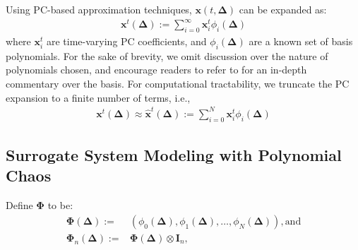 \documentclass[letterpaper, 10 pt, conference]{ieeeconf}  %
\newcommand{\real}{\mathbb{R}}
\newcommand{\vo}[1]{\boldsymbol{#1}}
\newcommand{\Del}{\vo{\Delta}}
\begin{document}
 Using PC-based approximation techniques, $\vo{x}(t,\Del)$ can be expanded as:
\begin{align}
   \vo{x}^t(\Del) := \sum_{i=0}^{\infty}\vo{x}_i^t\phi_i(\Del)
\end{align}
where $\vo{x}_i^t$ are time-varying PC coefficients, and $\phi_i(\Del)$ are a known set of basis polynomials.
For the sake of brevity, we omit discussion over the nature of polynomials chosen, and encourage readers to refer to \cite{bhattacharya2019robust} for an in-depth commentary over the basis.
For computational tractability, we truncate the PC expansion to a finite number of terms, i.e.,
\begin{align}
   \vo{x}^t(\Del) \approx \vo{\hat{x}}^t(\Del) := \sum_{i=0}^{N}\vo{x}_i^t\phi_i(\Del)
   \label{eqn:xApproxSum}
\end{align}

\subsection{Surrogate System Modeling with Polynomial Chaos}
Define $\vo{\Phi}$ to be:
\begin{align}
   \vo{\Phi}(\vo{\Delta}) :=& (\phi_0(\vo{\Delta}), \phi_1(\vo{\Delta}) {}, \hdots, {} \phi_N(\vo{\Delta})), \textrm{and} \\
   \vo{\Phi}_n(\vo{\Delta}) :=& \vo{\Phi}(\vo{\Delta}) \otimes \vo{I}_n,
\end{align}
\end{document}
